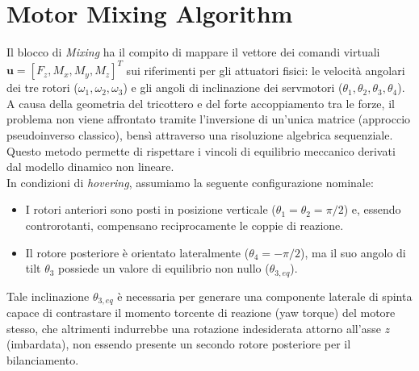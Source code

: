 \section{Motor Mixing Algorithm}
Il blocco di \textit{Mixing} ha il compito di mappare il vettore dei comandi virtuali \hbox{$\bm{u} = [F_z, M_x, M_y, M_z]^T$} sui riferimenti per gli attuatori fisici: le velocità angolari dei tre rotori ($\omega_1, \omega_2, \omega_3$) e gli angoli di inclinazione dei servmotori ($\theta_1, \theta_2, \theta_3, \theta_4$).
\\A causa della geometria del tricottero e del forte accoppiamento tra le forze, il problema non viene affrontato tramite l'inversione di un'unica matrice (approccio pseudoinverso classico), bensì attraverso una risoluzione algebrica sequenziale. Questo metodo permette di rispettare i vincoli di equilibrio meccanico derivati dal modello dinamico non lineare.
\\In condizioni di \textit{hovering}, assumiamo la seguente configurazione nominale:
\begin{itemize}
    \item I rotori anteriori sono posti in posizione verticale ($\theta_{1} = \theta_{2} = \pi/2$) e, essendo controrotanti, compensano reciprocamente le coppie di reazione.
    \item Il rotore posteriore è orientato lateralmente ($\theta_{4} = -\pi/2$), ma il suo angolo di tilt $\theta_{3}$ possiede un valore di equilibrio non nullo ($\theta_{3,eq}$).
\end{itemize}
Tale inclinazione $\theta_{3,eq}$ è necessaria per generare una componente laterale di spinta capace di contrastare il momento torcente di reazione (yaw torque) del motore stesso, che altrimenti indurrebbe una rotazione indesiderata attorno all'asse $z$ (imbardata), non essendo presente un secondo rotore posteriore per il bilanciamento.

